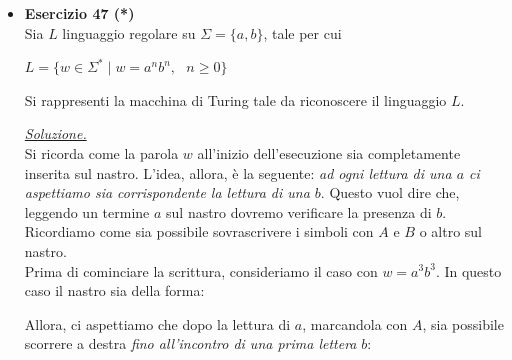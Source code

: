 \documentclass[a4paper,10pt]{article}
\begin{document}
{\normalsize
\begin{itemize}[label=, leftmargin=0pt]

    \item \textbf{Esercizio 47 (*)}\\ Sia $L$ linguaggio regolare su $\Sigma=\{a,b\}$, tale per cui 
    {\begin{center}
        $L = \{ w \in \Sigma^* \mid w = a^nb^n,\ \ \  n\geq0 \}$
    \end{center}} 
    Si rappresenti la macchina di Turing tale da riconoscere il linguaggio $L$.\\[0.1cm]

    \begin{osservazioni}
        \underline{\textit{Soluzione.}}\\
    Si ricorda come la parola $w$ all'inizio dell'esecuzione sia completamente inserita sul nastro. L'idea, allora, è la seguente: \textit{ad ogni lettura di una $a$ ci aspettiamo sia corrispondente la lettura di una $b$}. Questo vuol dire che, leggendo un termine $a$ sul nastro dovremo verificare la presenza di $b$. Ricordiamo come sia possibile sovrascrivere i simboli con $A$ e $B$ o altro sul nastro.\\
    
    Prima di cominciare la scrittura, consideriamo il caso con $w=a^3b^3$. In questo caso il nastro sia della forma:
    
    \begin{center}
    \end{center}

    Allora, ci aspettiamo che dopo la lettura di $a$, marcandola con $A$, sia possibile scorrere a destra \textit{fino all'incontro di una prima lettera } $b$:
    
    \begin{center}
    \begin{tikzpicture}[scale=0.5, every node/.style={minimum size=0.7cm}]
    

\end{tikzpicture}
\end{center}
\end{osservazioni}
\end{itemize}}
\end{document}
